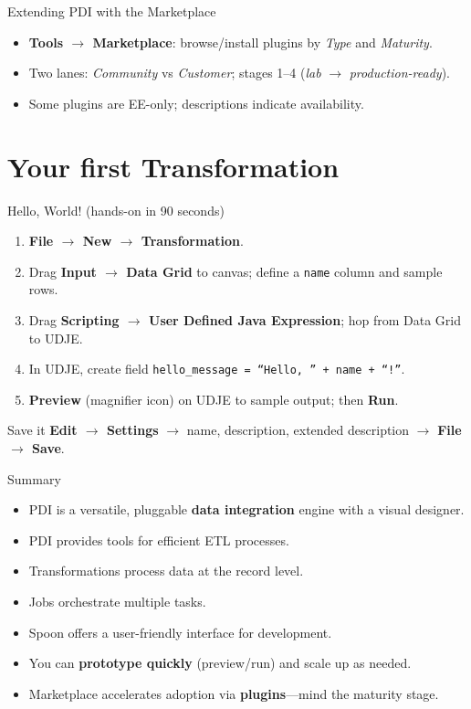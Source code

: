 \documentclass[aspectratio=169]{beamer}
\begin{document}
\begin{frame}{Extending PDI with the Marketplace}
    \begin{itemize}
    \item \textbf{Tools \(\rightarrow\) Marketplace}: browse/install plugins by \emph{Type} and \emph{Maturity}.
    \item Two lanes: \emph{Community} vs \emph{Customer}; stages 1–4 (\emph{lab} \(\rightarrow\) \emph{production-ready}).
    \item Some plugins are EE-only; descriptions indicate availability.
    \end{itemize}
\end{frame}

\section{Your first Transformation}

\begin{frame}{Hello, World! (hands-on in 90 seconds)}
    \begin{enumerate}
        \item \textbf{File \(\rightarrow\) New \(\rightarrow\) Transformation}.
        \item Drag \textbf{Input \(\rightarrow\) Data Grid} to canvas; define a \texttt{name} column and sample rows.
        \item Drag \textbf{Scripting \(\rightarrow\) User Defined Java Expression}; hop from Data Grid to UDJE.
        \item In UDJE, create field
        \texttt{hello\_message = ``Hello, '' + name + ``!''}.
        \item \textbf{Preview} (magnifier icon) on UDJE to sample output; then \textbf{Run}.
    \end{enumerate}
    \begin{block}{Save it}
        \textbf{Edit \(\rightarrow\) Settings} \(\rightarrow\) name, description, extended description \(\rightarrow\) \textbf{File \(\rightarrow\) Save}.
    \end{block}
\end{frame}

\begin{frame}{Summary}
    \begin{itemize}
        \item PDI is a versatile, pluggable \textbf{data integration} engine with a visual designer.
        \item PDI provides tools for efficient ETL processes.
        \item Transformations process data at the record level.
        \item Jobs orchestrate multiple tasks.
        \item Spoon offers a user-friendly interface for development.
        \item You can \textbf{prototype quickly} (preview/run) and scale up as needed.
        \item Marketplace accelerates adoption via \textbf{plugins}—mind the maturity stage.
    \end{itemize}
\end{frame}
\end{document}
